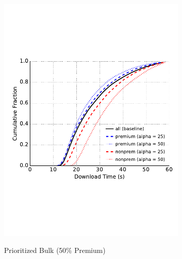 \begin{figure}
\begin{subfigure}[t]{0.32\textwidth}
\includegraphics[trim={0 3cm 0 3cm}, clip, width=1.0\textwidth]{images/modifier_pr50_bulk.pdf}
		\label{fig:stats_b}
		\caption{Prioritized Bulk (50\% Premium)}
	\end{subfigure}
	\begin{subfigure}[t]{0.32\textwidth} \centering

\end{subfigure}
\end{figure}
